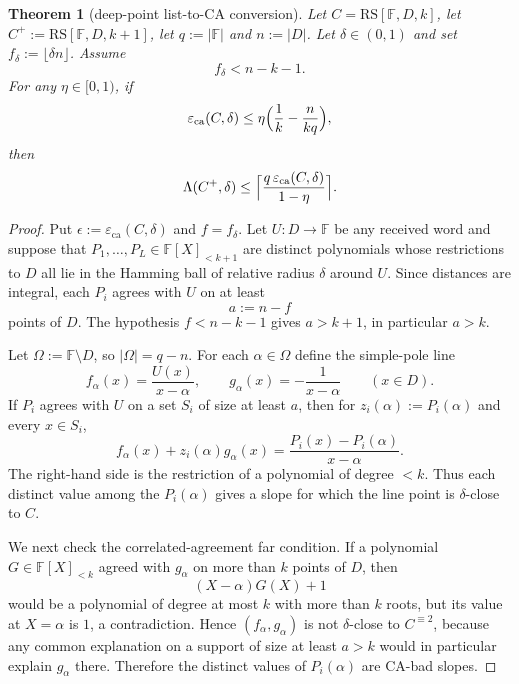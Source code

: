 \documentclass[11pt]{article}
\newtheorem{theorem}{Theorem}[section]
\theoremstyle{definition}
\theoremstyle{remark}
\newcommand{\F}{\mathbb{F}}
\newcommand{\RS}{\mathrm{RS}}
\newcommand{\eca}{\varepsilon_{\mathrm{ca}}}
\newcommand{\Lst}{\Lambda}
\begin{document}
\begin{theorem}[deep-point list-to-CA conversion]
\label{thm:A}
Let $C=\RS[\F,D,k]$, let $C^+:=\RS[\F,D,k+1]$, let
$q:=|\F|$ and $n:=|D|$.  Let $\delta\in(0,1)$ and set
$f_\delta:=\lfloor \delta n\rfloor$.  Assume
\[
        f_\delta < n-k-1 .
\]
For any $\eta\in[0,1)$, if
\[
        \eca(C,\delta)
        \le
        \eta\Bigl(\frac1k-\frac n{kq}\Bigr),
\]
then
\[
        \Lst(C^+,\delta)
        \le
        \Bigl\lceil
        \frac{q\,\eca(C,\delta)}{1-\eta}
        \Bigr\rceil .
\]
\end{theorem}

\begin{proof}
Put $\epsilon:=\eca(C,\delta)$ and $f=f_\delta$.
Let $U:D\to\F$ be any received word and suppose that
$P_1,\ldots,P_L\in\F[X]_{<k+1}$ are distinct polynomials whose
restrictions to $D$ all lie in the Hamming ball of relative radius
$\delta$ around $U$.  Since distances are integral, each $P_i$ agrees
with $U$ on at least
\[
        a:=n-f
\]
points of $D$.  The hypothesis $f<n-k-1$ gives $a>k+1$, in particular
$a>k$.

Let $\Omega:=\F\setminus D$, so $|\Omega|=q-n$.  For each
$\alpha\in\Omega$ define the simple-pole line
\[
        f_\alpha(x)=\frac{U(x)}{x-\alpha},
        \qquad
        g_\alpha(x)=-\frac1{x-\alpha}
        \qquad (x\in D).
\]
If $P_i$ agrees with $U$ on a set $S_i$ of size at least $a$, then for
$z_i(\alpha):=P_i(\alpha)$ and every $x\in S_i$,
\[
        f_\alpha(x)+z_i(\alpha)g_\alpha(x)
        =\frac{P_i(x)-P_i(\alpha)}{x-\alpha}.
\]
The right-hand side is the restriction of a polynomial of degree $<k$.
Thus each distinct value among the $P_i(\alpha)$ gives a slope for
which the line point is $\delta$-close to $C$.

We next check the correlated-agreement far condition.  If a polynomial
$G\in\F[X]_{<k}$ agreed with $g_\alpha$ on more than $k$ points of $D$,
then
\[
        (X-\alpha)G(X)+1
\]
would be a polynomial of degree at most $k$ with more than $k$ roots,
but its value at $X=\alpha$ is $1$, a contradiction.  Hence
$(f_\alpha,g_\alpha)$ is not $\delta$-close to $C^{\equiv2}$, because
any common explanation on a support of size at least $a>k$ would in
particular explain $g_\alpha$ there.  Therefore the distinct values of
$P_i(\alpha)$ are CA-bad slopes.


\end{proof}
\end{document}

